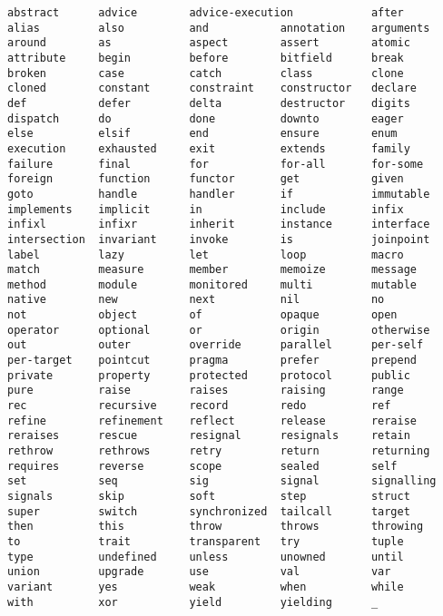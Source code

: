 \syntax\begin{lstlisting}
abstract      advice        advice-execution            after
alias         also          and           annotation    arguments
around        as            aspect        assert        atomic
attribute     begin         before        bitfield      break
broken        case          catch         class         clone
cloned        constant      constraint    constructor   declare
def           defer         delta         destructor    digits
dispatch      do            done          downto        eager
else          elsif         end           ensure        enum
execution     exhausted     exit          extends       family
failure       final         for           for-all       for-some
foreign       function      functor       get           given
goto          handle        handler       if            immutable
implements    implicit      in            include       infix
infixl        infixr        inherit       instance      interface
intersection  invariant     invoke        is            joinpoint
label         lazy          let           loop          macro
match         measure       member        memoize       message
method        module        monitored     multi         mutable
native        new           next          nil           no
not           object        of            opaque        open
operator      optional      or            origin        otherwise
out           outer         override      parallel      per-self
per-target    pointcut      pragma        prefer        prepend
private       property      protected     protocol      public
pure          raise         raises        raising       range
rec           recursive     record        redo          ref
refine        refinement    reflect       release       reraise
reraises      rescue        resignal      resignals     retain
rethrow       rethrows      retry         return        returning
requires      reverse       scope         sealed        self
set           seq           sig           signal        signalling
signals       skip          soft          step          struct
super         switch        synchronized  tailcall      target
then          this          throw         throws        throwing
to            trait         transparent   try           tuple
type          undefined     unless        unowned       until
union         upgrade       use           val           var
variant       yes           weak          when          while
with          xor           yield         yielding      _
\end{lstlisting}

